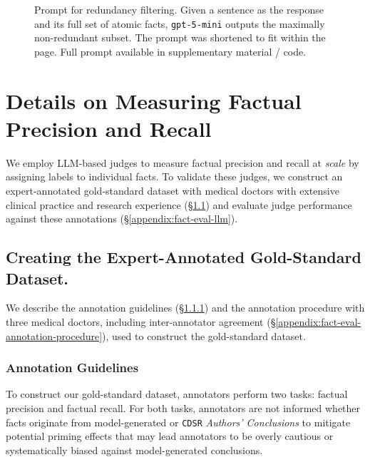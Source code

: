\documentclass{article}
\begin{document}
\begin{figure}[t!]
\begin{small}
\caption{Prompt for redundancy filtering. Given a sentence as the response and its full set of atomic facts, \texttt{gpt-5-mini} outputs the maximally non-redundant subset. The prompt was shortened to fit within the page. Full prompt available in supplementary material / code.}
\label{fig:redundant-fact-prompt}
\end{small}
\end{figure}




\clearpage




\section{Details on Measuring Factual Precision and Recall}\label{appendix:details-measuring-fact}

We employ LLM-based judges to measure factual precision and recall at \textit{scale} by assigning labels to individual facts. To validate these judges, we construct an expert-annotated gold-standard dataset with medical doctors with extensive clinical practice and research experience (\S\ref{appendix:fact-eval-annotation}) and evaluate judge performance against these annotations (\S\ref{appendix:fact-eval-llm}).

\subsection{Creating the Expert-Annotated Gold-Standard Dataset.}\label{appendix:fact-eval-annotation}

We describe the annotation guidelines (\S\ref{appendix:fact-eval-annotation-task}) and the annotation procedure with three medical doctors, including inter-annotator agreement (\S\ref{appendix:fact-eval-annotation-procedure}), used to construct the gold-standard dataset.

\subsubsection{Annotation Guidelines}\label{appendix:fact-eval-annotation-task}
To construct our gold-standard dataset, annotators perform two tasks: factual precision and factual recall. For both tasks, annotators are not informed whether facts originate from model-generated or \texttt{CDSR} \textit{Authors' Conclusions} to mitigate potential priming effects that may lead annotators to be overly cautious or systematically biased against model-generated conclusions.
\end{document}
